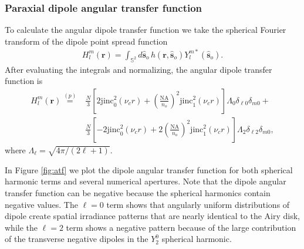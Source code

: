 \documentclass[]{osa-article}
\providecommand{\mb}[1]{\mathbf{#1}}
\providecommand{\so}{\mathbf{\hat{s}}_o}
\providecommand{\mbb}[1]{\mathbb{#1}}
\begin{document}
 \subsubsection{Paraxial dipole angular transfer function}
 To calculate the angular dipole transfer function we take the spherical Fourier
 transform of the dipole point spread function
 \begin{align}
H_l^m(\mb{r}) \stackrel{}{=} \int_{\mbb{S}^2}d\so\, h(\mb{r}, \so)Y_l^{m*}(\so).
 \end{align}
 After evaluating the integrals and normalizing, the angular dipole transfer
 function is
 \begin{align}
   H_l^m(\mb{r}) \stackrel{(p)}{=} &\frac{N}{3}\left[2\text{jinc}_0^2(\nu_cr) + \left(\frac{\text{NA}}{n_o}\right)^2\text{jinc}_1^2(\nu_c r)\right]\Lambda_0\delta_{\ell0}\delta_{m0} + \nonumber\\& \frac{N}{3}\left[-2\text{jinc}_0^2(\nu_c r) + 2\left(\frac{\text{NA}}{n_o}\right)^2\text{jinc}_1^2(\nu_c r)\right]\Lambda_2\delta_{\ell2}\delta_{m0},
 \end{align}
where $\Lambda_{\ell} = \sqrt{4\pi/(2\ell + 1)}$. 

In Figure \ref{fig:atf} we plot the dipole angular transfer function for both
spherical harmonic terms and several numerical apertures. Note that the dipole
angular transfer function can be negative because the spherical harmonics
contain negative values. The $\ell=0$ term shows that angularly uniform
distributions of dipole create spatial irradiance patterns that are nearly
identical to the Airy disk, while the $\ell=2$ term shows a negative pattern
because of the large contribution of the transverse negative dipoles in the
$Y_2^0$ spherical harmonic.

\end{document}
